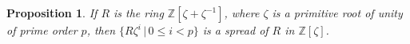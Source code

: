 \documentclass{amsart}
\theoremstyle{plain}
\newtheorem{proposition}[theorem]{Proposition}
\theoremstyle{definition}
\newcommand{\id}{\mathrm{id}}
\newcommand{\ent}{\mathcal{O}}
\newcommand{\Z}{\ensuremath{\mathbb{Z}}}
\newcommand{\nrg}{R}
\begin{document}

\begin{proposition}\label{prop:spread_example}
	If $\nrg$ is the ring $\Z[\zeta+\zeta^{-1}]$, where \(\zeta\) is a primitive root of unity of prime order \(p\), 
	then $\{\nrg \zeta^i\,|\, 0\le i < p\}$ is a spread of \(R\) in $\Z[\zeta]$. 
\end{proposition}
\end{document}
